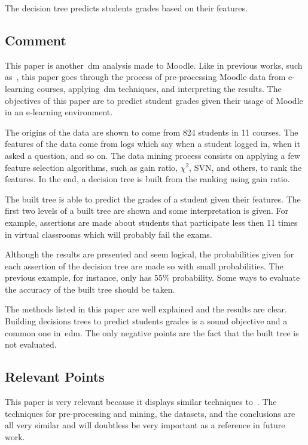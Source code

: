 The decision tree predicts students grades based on their features.

\subsection{Comment}

This paper is another~\gls{dm} analysis made to Moodle. Like in previous works,
such as~\cite{ind_008, ind_003}, this paper goes through the process of
pre-processing Moodle data from e-learning courses, applying~\gls{dm}
techniques, and interpreting the results. The objectives of this paper are to
predict student grades given their usage of Moodle in an e-learning
environment.

The origins of the data are shown to come from 824 students in 11 courses. The
features of the data come from logs which say when a student logged in, when it
asked a question, and so on. The data mining process consists on applying a few
feature selection algorithms, such as gain ratio, $ \chi^2 $, SVN, and others,
to rank the features. In the end, a decision tree is built from the ranking
using gain ratio.

The built tree is able to predict the grades of a student given their features.
The first two levels of a built tree are shown and some interpretation is
given. For example, assertions are made about students that participate less
then 11 times in virtual classrooms which will probably fail the exams.

Although the results are presented and seem logical, the probabilities given
for each assertion of the decision tree are made so with small probabilities.
The previous example, for instance, only has 55\% probability. Some ways to
evaluate the accuracy of the built tree should be taken.

The methods listed in this paper are well explained and the results are clear.
Building decisions trees to predict students grades is a sound objective and a
common one in~\gls{edm}. The only negative points are the fact that the built
tree is not evaluated.

\subsection{Relevant Points}

This paper is very relevant because it displays similar techniques
to~\cite{ind_008, ind_003}. The techniques for pre-processing and mining, the
datasets, and the conclusions are all very similar and will doubtless be very
important as a reference in future work.

